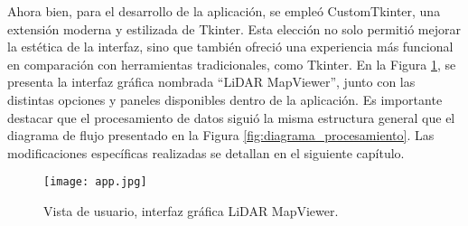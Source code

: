 Ahora bien, para el desarrollo de la aplicación, se empleó CustomTkinter, una extensión moderna y estilizada de Tkinter. Esta elección no solo permitió mejorar la estética de la interfaz, sino que también ofreció una experiencia más funcional en comparación con herramientas tradicionales, como Tkinter. En la Figura \ref{fig:vista_interfaz}, se presenta la interfaz gráfica nombrada ``LiDAR MapViewer'', junto con las distintas opciones y paneles disponibles dentro de la aplicación. Es importante destacar que el procesamiento de datos siguió la misma estructura general que el diagrama de flujo presentado en la Figura \ref{fig:diagrama_procesamiento}. Las modificaciones específicas realizadas se detallan en el siguiente capítulo.

\begin{figure}[H]
	\centering
	\texttt{[image: app.jpg]}
	\caption{Vista de usuario, interfaz gráfica LiDAR MapViewer.}
	\label{fig:vista_interfaz}
\end{figure}

